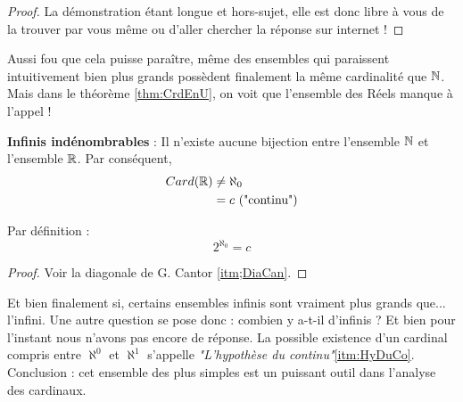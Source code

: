 \begin{proof}
La démonstration étant longue et hors-sujet, elle est donc libre à vous de la trouver par vous même ou d'aller chercher la réponse sur internet !
\end{proof}

Aussi fou que cela puisse paraître, même des ensembles qui paraissent intuitivement bien plus grands possèdent finalement la même cardinalité que $\mathbb{N}$. \newline
Mais dans le théorème \ref{thm:CrdEnU}, on voit que l'ensemble des Réels manque à l'appel !

\begin{theorem}
\textbf{Infinis indénombrables} : \newline
Il  n'existe aucune bijection entre l'ensemble $\mathbb{N}$ et l'ensemble $\mathbb{R}$. \newline
Par conséquent,
\begin{align*}
    Card(\mathbb{R}) & \not= \aleph_0 \\
    & = c \ \text{("continu")}
\end{align*}

Par définition :
$$2^{\aleph_0} = c$$
\end{theorem}

\begin{proof}
Voir la diagonale de G. Cantor \ref{itm;DiaCan}.
\end{proof}


Et bien finalement si, certains ensembles infinis sont vraiment plus grands que... l'infini. \newline
\newline
Une autre question se pose donc : combien y a-t-il d'infinis ? \newline
Et bien pour l'instant nous n'avons pas encore de réponse. La possible existence d'un cardinal compris entre $\aleph^{0}$ et $\aleph^{1}$ s'appelle \textit{"L'hypothèse du continu"}\ref{itm:HyDuCo}.
\newline
\newline
Conclusion : cet ensemble des plus simples est un puissant outil dans l'analyse des cardinaux.